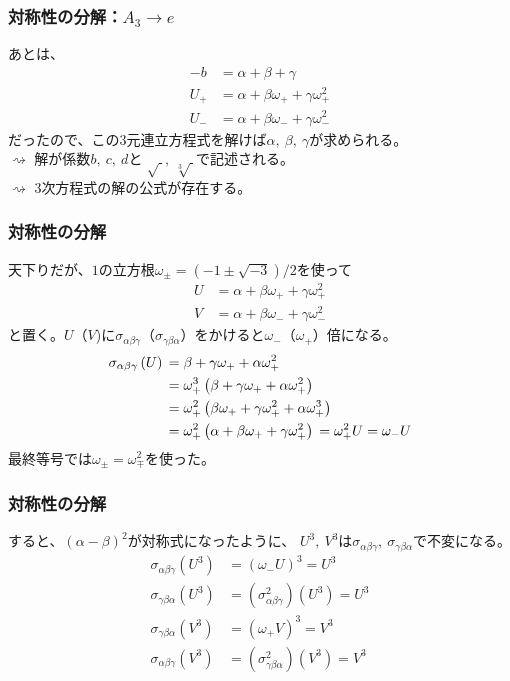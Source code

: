 \documentclass[12pt, t]{beamer}
\newcommand{\lr}[1]{\left({}#1\right){}}
\begin{document}
\begin{frame}
\frametitle{対称性の分解：$A_3 \rightarrow e$}
あとは、
\begin{align}
  -b   &= \alpha + \beta + \gamma \\
  U_+  &= \alpha + \beta \omega_+ + \gamma \omega_+^2 \\
  U_-  &= \alpha + \beta \omega_- + \gamma \omega_-^2
\end{align}
だったので、この$3$元連立方程式を解けば$\alpha,\ \beta,\ \gamma$が求められる。\\
$\rightsquigarrow$ 解が係数$b,\ c,\ d$と
$\sqrt{\ },\ \sqrt[3]{\ }$で記述される。\\
$\rightsquigarrow$ $3$次方程式の解の公式が存在する。
\end{frame}





\begin{frame}
\frametitle{対称性の分解}
天下りだが、$1$の立方根$\omega_{\pm} = (-1 \pm \sqrt{-3})/2$を使って
\begin{align}
  U &= \alpha + \beta \omega_+ + \gamma \omega_+^2 \\
  V &= \alpha + \beta \omega_- + \gamma \omega_-^2
\end{align}
と置く。$U$（$V$)に$\sigma_{\alpha \beta \gamma}$（$\sigma_{\gamma \beta \alpha}$）をかけると$\omega_-$（$\omega_+$）倍になる。
\begin{align}
  \sigma_{\alpha \beta \gamma}\lr{U} &= \beta + \gamma \omega_+ + \alpha \omega_+^2 \notag \\
                                     &= \omega_+^3 \lr{\beta + \gamma \omega_+ + \alpha \omega_+^2} \notag \\
                                     &= \omega_+^2 \lr{\beta \omega_+ + \gamma \omega_+^2 + \alpha \omega_+^3} \notag \\
                                     &= \omega_+^2 \lr{\alpha + \beta \omega_+ + \gamma \omega_+^2} = \omega_+^2 U = \omega_- U
\end{align}
最終等号では$\omega_\pm = \omega_{\mp}^2$を使った。
\end{frame}

\begin{frame}
\frametitle{対称性の分解}
すると、$(\alpha - \beta)^2$が対称式になったように、
$U^3,\ V^3$は$\sigma_{\alpha \beta \gamma},\ \sigma_{\gamma \beta \alpha}$で不変になる。
\begin{align}
  \sigma_{\alpha \beta \gamma} \lr{U^3} &= (\omega_- U)^3 = U^3 \\
  \sigma_{\gamma \beta \alpha} \lr{U^3} &= \lr{\sigma_{\alpha \beta \gamma}^2}\lr{U^3} = U^3 \\
  \sigma_{\gamma \beta \alpha} \lr{V^3} &= (\omega_+ V)^3 = V^3 \\
  \sigma_{\alpha \beta \gamma} \lr{V^3} &= \lr{\sigma_{\gamma \beta \alpha}^2}\lr{V^3} = V^3 \\
\end{align}
\end{frame}
\end{document}
